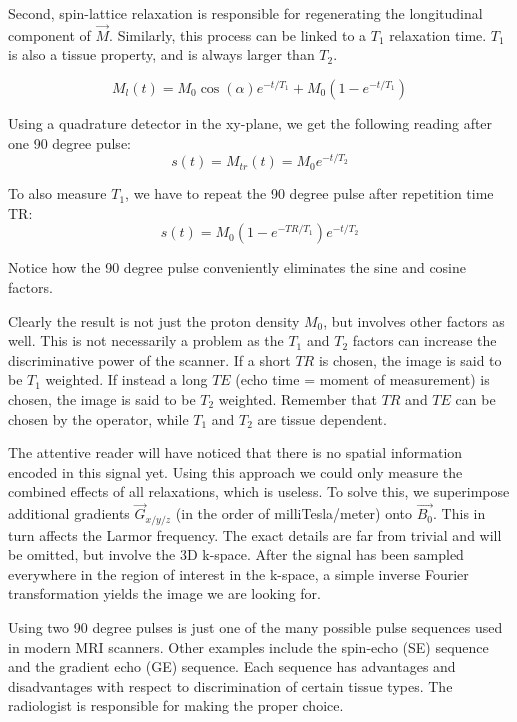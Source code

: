 Second, spin-lattice relaxation is responsible for regenerating the
longitudinal component of $\vec{M}$. Similarly, this process can be linked to a
$T_1$ relaxation time. $T_1$ is also a tissue property, and is always larger
than $T_2$.

\begin{equation}
M_l(t) = M_0 \cos(\alpha) e^{-t/T_1} + M_0 (1 - e^{-t/T_1})
\end{equation}

Using a quadrature detector in the xy-plane, we get the following reading
after one 90 degree pulse:
\begin{equation}
s(t) = M_{tr}(t) = M_0 e^{-t/T_2}
\end{equation}

To also measure $T_1$, we have to repeat the 90 degree pulse after repetition
time TR:
\begin{equation}
s(t) = M_0 (1 - e^{-TR/T_1}) e^{-t/T_2}
\end{equation}

Notice how the 90 degree pulse conveniently eliminates the sine and cosine
factors.

Clearly the result is not just the proton density $M_0$, but involves
other factors as well. This is not necessarily a problem as the $T_1$ and
$T_2$ factors can increase the discriminative power of the scanner. If a short
$TR$ is chosen, the image is said to be $T_1$ weighted. If instead a long $TE$
(echo time = moment of measurement) is chosen, the image is said to be $T_2$
weighted. Remember that $TR$ and $TE$ can be chosen by the operator, while $T_1$
and $T_2$ are tissue dependent.

The attentive reader will have noticed that there is no spatial information
encoded in this signal yet. Using this approach we could only measure the
combined effects of all relaxations, which is useless. To solve this, we
superimpose additional gradients $\vec{G}_{x/y/z}$ (in the order of
milliTesla/meter) onto $\vec{B_0}$. This in turn affects the Larmor frequency.
The exact details are far from trivial and will be omitted, but involve the
3D k-space. After the signal has been sampled everywhere in the region of
interest in the k-space, a simple inverse Fourier transformation yields the
image we are looking for.

Using two 90 degree pulses is just one of the many possible pulse sequences used
in modern MRI scanners. Other examples include the spin-echo (SE) sequence and
the gradient echo (GE) sequence. Each sequence has advantages and disadvantages
with respect to discrimination of certain tissue types. The radiologist is
responsible for making the proper choice.

